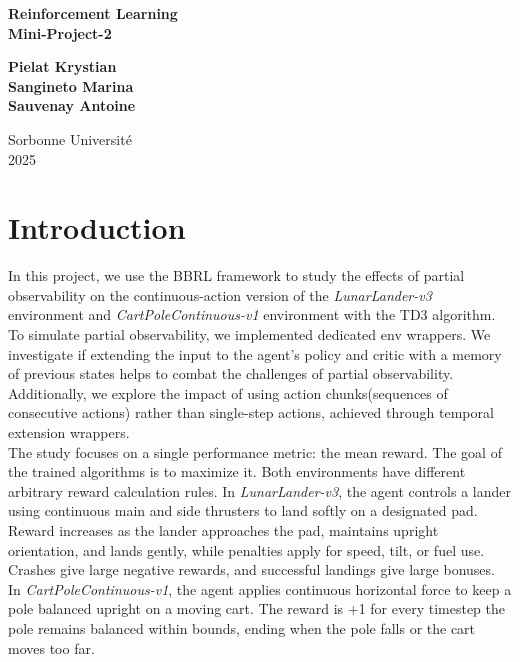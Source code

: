 \documentclass[12pt, a4paper]{article}
\begin{document}
\thispagestyle{empty}

\begin{center}
	{\bfseries \LARGE Reinforcement Learning \\[2mm]
	Mini-Project-2}

	\vfill

	{\large
	\textbf{Pielat Krystian} \\[2mm]
	\textbf{Sangineto Marina} \\[2mm]
	\textbf{Sauvenay Antoine}
	}

	\vfill


	\vfill

	{\large Sorbonne Université} \\[2mm]
	{\large 2025}
\end{center}

\newpage
\tableofcontents
\newpage

\section{Introduction}

In this project, we use the BBRL framework to study the effects of partial observability on the continuous-action version of the \textit{LunarLander-v3} environment and \textit{CartPoleContinuous-v1} environment with the TD3 algorithm.\\

To simulate partial observability, we implemented dedicated env wrappers. We investigate if extending the input to the agent’s policy and critic with a memory of previous states helps to combat the challenges of partial observability. Additionally, we explore the impact of using action chunks(sequences of consecutive actions) rather than single-step actions, achieved through temporal extension wrappers.\\

The study focuses on a single performance metric: the mean reward. The goal of the trained algorithms is to maximize it. Both environments have different arbitrary reward calculation rules. In \textit{LunarLander-v3}, the agent controls a lander using continuous main and side thrusters to land softly on a designated pad. Reward increases as the lander approaches the pad, maintains upright orientation, and lands gently, while penalties apply for speed, tilt, or fuel use. Crashes give large negative rewards, and successful landings give large bonuses. In \textit{CartPoleContinuous-v1}, the agent applies continuous horizontal force to keep a pole balanced upright on a moving cart. The reward is +1 for every timestep the pole remains balanced within bounds, ending when the pole falls or the cart moves too far.
\end{document}

